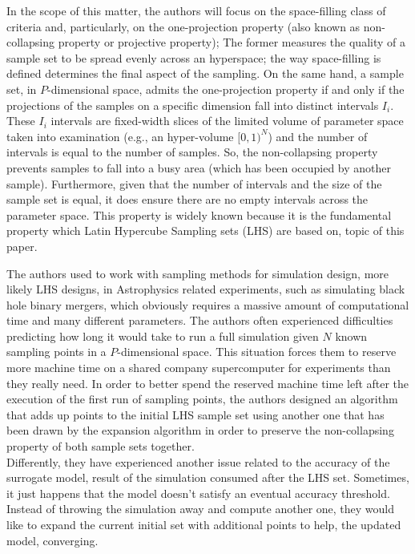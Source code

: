 \documentclass[12pt]{extarticle}
\begin{document}
In the scope of this matter, the authors will focus on the space-filling class of criteria and, particularly, on the one-projection property (also known as non-collapsing property or projective property); The former measures the quality of a sample set to be spread evenly across an hyperspace; the way space-filling is defined determines the final aspect of the sampling. On the same hand, a sample set, in $P$-dimensional space, admits the one-projection property if and only if the projections of the samples on a specific dimension fall into distinct intervals $I_i$. These $I_i$ intervals are fixed-width slices of the limited volume of parameter space taken into examination (e.g., an hyper-volume $[0,1)^N$) and the number of intervals is equal to the number of samples. So, the non-collapsing property prevents samples to fall into a busy area (which has been occupied by another sample). Furthermore, given that the number of intervals and the size of the sample set is equal, it does ensure there are no empty intervals across the parameter space. This property is widely known because it is the fundamental property which Latin Hypercube Sampling sets (LHS) are based on, topic of this paper.

The authors used to work with sampling methods for simulation design, more likely LHS designs, in Astrophysics related experiments, such as simulating black hole binary mergers, which obviously requires a massive amount of computational time and many different parameters. The authors often experienced difficulties predicting how long it would take to run a full simulation given $N$ known sampling points in a $P$-dimensional space. This situation forces them to reserve more machine time on a shared company supercomputer for experiments than they really need. In order to better spend the reserved machine time left after the execution of the first run of sampling points, the authors designed an algorithm that adds up points to the initial LHS sample set using another one that has been drawn by the expansion algorithm in order to preserve the non-collapsing property of both sample sets together.\\
Differently, they have experienced another issue related to the accuracy of the surrogate model, result of the simulation consumed after the LHS set. Sometimes, it just happens that the model doesn't satisfy an eventual accuracy threshold. Instead of throwing the simulation away and compute another one, they would like to expand the current initial set with additional points to help, the updated model, converging.
\end{document}
